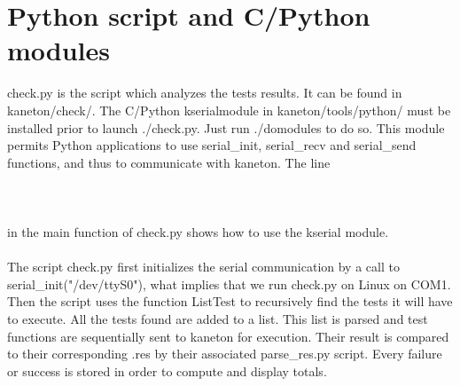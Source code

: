 \section{Python script and C/Python modules}

check.py is the script which analyzes the tests results. It  can be found in
kaneton/check/. The C/Python kserialmodule in kaneton/tools/python/ must be
installed prior to launch ./check.py. Just run ./domodules to do so. This
module permits Python applications to use serial\_init, serial\_recv and
serial\_send functions, and thus to communicate with kaneton. The line\\
\\
\\
\\
in the main function of check.py shows how to use the kserial module.\\
\\
\indent The script check.py first initializes the serial communication by a
call to serial\_init("/dev/ttyS0"), what implies that we run check.py on Linux
on COM1. Then the script uses the function ListTest to recursively find the tests
it will have to execute. All the tests found are added to a list. This list is
parsed and test functions are sequentially sent to kaneton for execution. Their
result is compared to their corresponding .res by their associated
parse\_res.py script. Every failure or success is stored in order to compute
and display totals.



